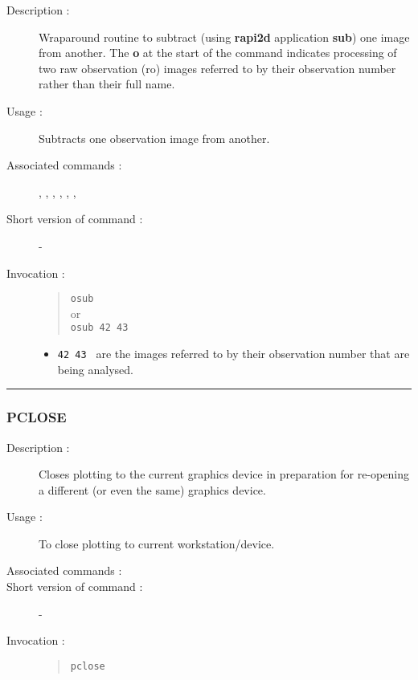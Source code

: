 \begin{description}

\item[Description :] Wraparound routine to subtract (using {\bf rapi2d}
application {\bf sub}) one image from another.  The {\bf o} at the start of
the command indicates processing of two raw observation ({\sc ro})
images referred to by their observation number rather than their full
name.

\item[Usage :] Subtracts one observation image from another.

\item[Associated commands :] {\tt {}}, 
{\tt {}}, {\tt {}}, 
{\tt {}}, {\tt {}}, 
{\tt {}}, {\tt {}}

\item[Short version of command :] -
\item[Invocation :]

\begin{quote}{\tt  osub }\\
or \\
{\tt osub 42 43 }
\end{quote}

\begin{itemize}

\item {\tt 42 43 } are the images referred to by their observation
 number that  are being analysed.
\end{itemize}

\end{description}

\hrule 
\subsubsection*{\label{PCLOSE}PCLOSE}

\begin{description}

\item[Description :] Closes plotting to the current graphics device in
preparation for re-opening a different (or even the same) graphics
device.

\item[Usage :] To close plotting to current workstation/device.
\item[Associated commands :] {\tt {}}
\item[Short version of command :] -
\item[Invocation :]

\begin{quote}{\tt  pclose }\end{quote}

\end{description}

